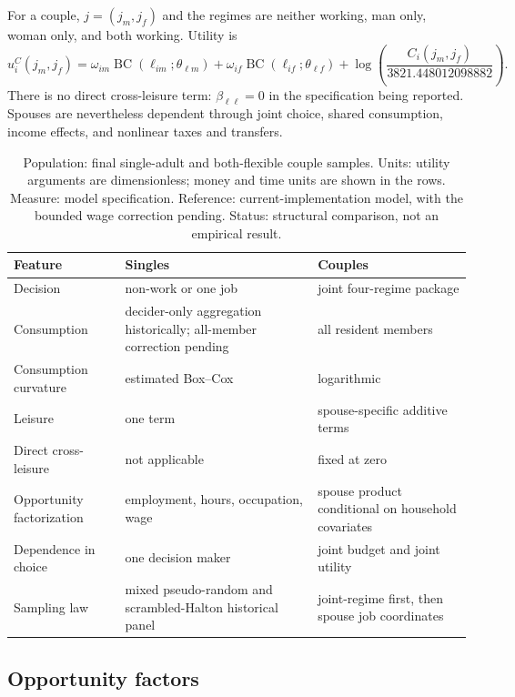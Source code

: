 \documentclass[11pt,a4paper]{article}
\newcommand{\BC}{\operatorname{BC}}
\begin{document}
For a couple, $j=(j_m,j_f)$ and the regimes are neither working, man only,
woman only, and both working. Utility is
\begin{equation}
u_i^C(j_m,j_f)=\omega_{im}\BC(\ell_{im};\theta_{\ell m})
+\omega_{if}\BC(\ell_{if};\theta_{\ell f})
+\log\!\left(\frac{C_i(j_m,j_f)}{3821.448012098882}\right).
\label{eq:coupleutility}
\end{equation}
There is no direct cross-leisure term: $\beta_{\ell\ell}=0$ in the specification
being reported. Spouses are nevertheless dependent through joint choice,
shared consumption, income effects, and nonlinear taxes and transfers.

\begin{table}[htbp]
\centering
\caption{Population: final single-adult and both-flexible couple samples. Units:
utility arguments are dimensionless; money and time units are shown in the
rows. Measure: model specification. Reference: current-implementation model,
with the bounded wage correction pending. Status: structural comparison, not an
empirical result.}
\label{tab:spec}
\begin{tabular}{p{.24\linewidth}p{.32\linewidth}p{.32\linewidth}}
\toprule
Feature & Singles & Couples\\
\midrule
Decision & non-work or one job & joint four-regime package\\
Consumption & decider-only aggregation historically; all-member correction pending & all resident members\\
Consumption curvature & estimated Box--Cox & logarithmic\\
Leisure & one term & spouse-specific additive terms\\
Direct cross-leisure & not applicable & fixed at zero\\
Opportunity factorization & employment, hours, occupation, wage & spouse product conditional on household covariates\\
Dependence in choice & one decision maker & joint budget and joint utility\\
Sampling law & mixed pseudo-random and scrambled-Halton historical panel & joint-regime first, then spouse job coordinates\\
\bottomrule
\end{tabular}
\end{table}

\subsection{Opportunity factors}
\end{document}
